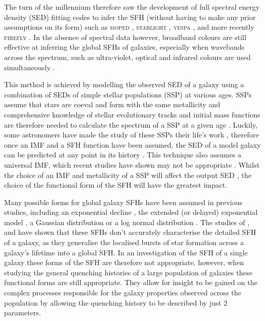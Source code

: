The turn of the millennium therefore saw the development of full spectral energy density (SED) fitting codes to infer the SFH (without having to make any prior assumptions on its form) such as \textsc{moped} \citep{heavens00}, \textsc{starlight} \citep{cidfernandes05}, \textsc{vespa} \citep{tojeiro07}, and more recently \textsc{firefly} \citep{wilkinson15}. In the absence of spectral data however, broadband colours are still effective at inferring the global SFHs of galaxies, especially when wavebands across the spectrum, such as ultra-violet, optical and infrared colours are used simultaneously \citep{madau98}. 

This method is achieved by modelling the observed SED of a galaxy using a combination of SEDs of simple stellar populations (SSP) at various ages. SSPs assume that stars are coeval and form with the same metallicity and comprehensive knowledge of stellar evolutionary tracks and initial mass functions \citep[IMF;][]{salpeter55, chabrier03} are therefore needed to calculate the spectrum of a SSP at a given age \citep{chen10, kriek10}. Luckily, some astronomers have made the study of these SSPs their life's work \citep[for example][]{BC03, Maraston05, vazquez05, CGW09}, therefore once an IMF and a SFH function have been assumed, the SED of a model galaxy can be predicted at any point in its history \citep{chen10}. This technique also assumes a universal IMF, which recent studies have shown may not be appropriate \citep{vandokkum08, conroy12, cappellari12, smithr15}. Whilst the choice of an IMF and metallicity of a SSP will affect the output SED \citep{CGW09, kriek10}, the choice of the functional form of the SFH will have the greatest impact. 

Many possible forms for global galaxy SFHs have been assumed in previous studies, including an exponential decline \citep{tinsley72, gavazzi02, weiner06, Martin07, noeske07, kriek10,  schawinski14, hart16}, the extended (or delayed) exponential model \citep{gavazzi02, oemler13, simha14}, a Gaussian distribution \citep{feuillet16} or a log normal distribution \citep{gladders13, abramson16}. The studies of \cite{lee10}, \cite{boquien14} and \cite{smith15} have shown that these SFHs don't accurately characterise the detailed SFH of a galaxy, as they generalise the localised bursts of star formation across a galaxy's lifetime into a global SFH. In an investigation of the SFH of a single galaxy these forms of the SFH are therefore not appropriate, however, when studying the general quenching histories of a large population of galaxies these functional forms are still appropriate. They allow for insight to be gained on the complex processes responsible for the galaxy properties observed across the population by allowing the quenching history to be described by just $2$ parameters. 

